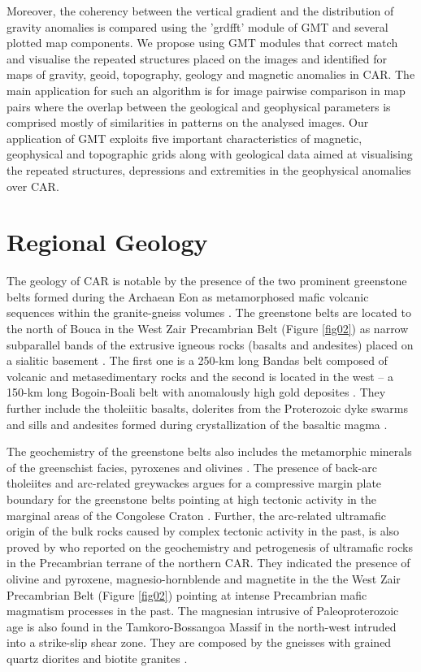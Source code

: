 \documentclass[minerals,article,submit,pdftex,moreauthors]{Definitions/mdpi}
\begin{document}
Moreover, the coherency between the vertical gradient and the distribution of gravity anomalies is compared using the 'grdfft' module of GMT and several plotted map components. We propose using GMT modules that correct match and visualise the repeated structures placed on the images and identified for maps of gravity, geoid, topography, geology and magnetic anomalies in CAR. The main application for such an algorithm is for image pairwise comparison in map pairs where the overlap between the geological and geophysical parameters is comprised mostly of similarities in patterns on the analysed images. Our application of GMT exploits five important characteristics of magnetic, geophysical and topographic grids along with geological data aimed at visualising the repeated structures, depressions and extremities in the geophysical anomalies over CAR.

\section{Regional Geology} 

The geology of CAR is notable by the presence of the two prominent greenstone belts formed during the Archaean Eon as  metamorphosed mafic volcanic sequences within the granite-gneiss volumes \cite{Poidevin1991LesCD}. The greenstone belts are located to the north of Bouca in the West Zair Precambrian Belt (Figure \ref{fig02}) as narrow subparallel bands of the extrusive igneous rocks (basalts and andesites) placed on a sialitic basement \cite{Boulvert1983}. The first one is a 250-km long Bandas belt composed of volcanic and metasedimentary rocks \cite{POIDEVIN1981157} and the second is located in the west -- a 150-km long Bogoin-Boali belt with anomalously high gold deposites \cite{Dostal}. They further include the tholeiitic basalts, dolerites from the Proterozoic dyke swarms and sills and andesites formed during crystallization of the basaltic magma \cite{Poidevin1985}. 

The geochemistry of the greenstone belts also includes the metamorphic minerals of the greenschist facies, pyroxenes and olivines \cite{POIDEVIN199497}. The presence of back-arc tholeiites and arc-related greywackes argues for a compressive margin plate boundary for the greenstone belts pointing at high tectonic activity in the marginal areas of the Congolese Craton \cite{cornacchia1989existence}. Further, the arc-related ultramafic origin of the bulk rocks caused by complex tectonic activity in the past, is also proved by \cite{Tanko} who reported on the geochemistry and petrogenesis of ultramafic rocks in the Precambrian terrane of the northern CAR. They indicated the presence of olivine and pyroxene, magnesio-hornblende and magnetite in the the West Zair Precambrian Belt (Figure \ref{fig02}) pointing at intense Precambrian mafic magmatism processes in the past. The magnesian intrusive of Paleoproterozoic age is also found in the Tamkoro-Bossangoa Massif in the north-west intruded into a strike-slip shear zone. They are composed by the gneisses with grained quartz diorites and biotite granites \cite{jgg2014243}.
\end{document}
